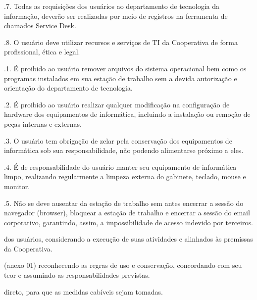 \documentclass[letterpaper,10pt,portuges]{sphinxmanual}
\begin{document}
.7. Todas as requisições dos usuários ao departamento de tecnologia da informação,
deverão ser realizadas por meio de registros na ferramenta de chamados Service Desk.

.8. O usuário deve utilizar recursos e serviços de TI da Cooperativa de forma
profissional, ética e legal.

\sphinxAtStartPar
{}

.1. É proibido ao usuário remover arquivos do sistema operacional bem como os programas
instalados em sua estação de trabalho sem a devida autorização e orientação do departamento de tecnologia.

.2. É proibido ao usuário realizar qualquer modificação na configuração de hardware dos equipamentos
de informática, incluindo a instalação ou remoção de peças internas e externas.

.3. O usuário tem obrigação de zelar pela conservação dos equipamentos de informática sob sua responsabilidade,
não podendo alimentar\sphinxhyphen{}se próximo a eles.

.4. É de responsabilidade do usuário manter seu equipamento de informática limpo, realizando regularmente a
limpeza externa do gabinete, teclado, mouse e monitor.

.5. Não se deve ausentar da estação de trabalho sem antes encerrar a sessão do navegador (browser), bloquear a
estação de trabalho e encerrar a sessão do e\sphinxhyphen{}mail corporativo, garantindo, assim, a impossibilidade de acesso indevido por terceiros.
\begin{description}
\sphinxAtStartPar
dos usuários, considerando a execução de suas atividades e alinhados às premissas da Cooperativa.

\sphinxAtStartPar
(anexo 01) reconhecendo as regras de uso e conservação, concordando com seu teor e assumindo as responsabilidades
previstas.

\sphinxAtStartPar
direto, para que as medidas cabíveis sejam tomadas.

\end{description}
\end{document}
